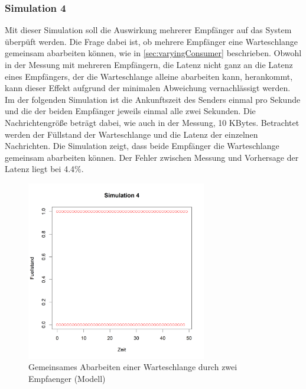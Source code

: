 \subsubsection{Simulation 4}
Mit dieser Simulation soll die Auswirkung mehrerer Empfänger auf das System überpüft werden. Die Frage dabei ist, ob mehrere Empfänger eine Warteschlange gemeinsam abarbeiten können, wie in \autoref{sec:varyingConsumer} beschrieben. Obwohl in der Messung mit mehreren Empfängern, die Latenz nicht ganz an die Latenz eines Empfängers, der die Warteschlange alleine abarbeiten kann, herankommt, kann dieser Effekt aufgrund der minimalen Abweichung vernachlässigt werden. Im der folgenden Simulation ist die Ankunftszeit des Senders einmal pro Sekunde und die der beiden Empfänger jeweils einmal alle zwei Sekunden. Die Nachrichtengröße beträgt dabei, wie auch in der Messung, 10 KBytes. Betrachtet werden der Füllstand der Warteschlange und die Latenz der einzelnen Nachrichten. 
Die Simulation zeigt, dass beide Empfänger die Warteschlange gemeinsam abarbeiten können. Der Fehler zwischen Messung und Vorhersage der Latenz liegt bei 4.4\%. 

\begin{figure}
\center
  \includegraphics[width=0.7\textwidth]{images/modelSimulationResults/simulation4.png}
  \caption{Gemeinsames Abarbeiten einer Warteschlange durch zwei Empfaenger (Modell)}
  \label{img:simulation4}
\end{figure}



